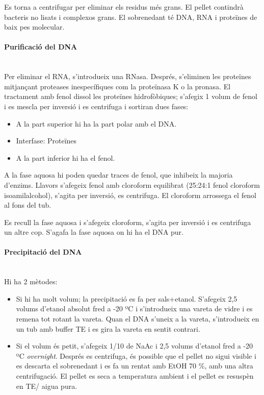 Es torna a centrifugar per eliminar els residus més grans. El pellet
contindrà bacteris no lisats i complexos grans. El sobrenedant té DNA,
RNA i proteïnes de baix pes molecular.

\paragraph{Purificació del DNA} \hfill \\
Per eliminar el RNA, s'introdueix una RNasa. Després, s'eliminen les
proteïnes mitjançant proteases inespecífiques com la proteïnasa K o la
pronasa. El tractament amb fenol dissol les proteïnes hidrofòbiques;
s'afegix 1 volum de fenol i es
mescla per inversió i es centrifuga i sortiran dues fases:
\begin{itemize}
\item A la part superior hi ha la part polar amb el DNA.
\item Interfase: Proteïnes
\item A la part inferior hi ha el fenol.
\end{itemize}

A la fase aquosa hi poden quedar traces de fenol, que inhibeix la
majoria d'enzims. Llavors s'afegeix fenol amb cloroform equilibrat
(25:24:1 fenol cloroform isoamilalcohol), s'agita per inversió, es
centrifuga. El cloroform arrossega el fenol al fons del tub.

Es recull la fase aquosa i s'afegeix cloroform, s'agita per inversió i es centrifuga un altre
cop. S'agafa la fase aquosa on hi ha el DNA pur.

\paragraph{Precipitació del DNA} \hfill \\
Hi ha 2 mètodes:
\begin{itemize}
\item Si hi ha molt volum; la precipitació es fa per
  sals+etanol. S'afegeix 2,5 volums d'etanol absolut fred a -20 ºC i
  s'introdueix una vareta de vidre i es remena tot rotant la
  vareta. Quan el DNA s'uneix a la vareta, s'introdueix en un tub amb
  buffer TE i es gira la vareta en sentit contrari.

\item Si el volum és petit, s'afegeix 1/10 de NaAc i 2,5 volums
  d'etanol fred a -20 ºC \textit{overnight}. Després es centrifuga, és
  possible que el pellet no sigui visible i es descarta el sobrenedant
  i es fa un rentat amb EtOH 70 \%, amb una altra centrifugació. El
  pellet es seca a temperatura ambient i el pellet es resuspèn en TE/
  aigua pura.
\end{itemize}

